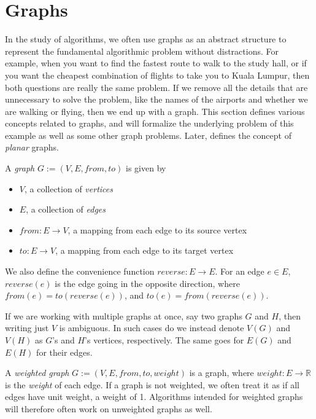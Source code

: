 \section{Graphs}
\label{section:graphs}
In the study of algorithms, we often use graphs as an abstract structure to represent the fundamental algorithmic problem without distractions. For example, when you want to find the fastest route to walk to the study hall, or if you want the cheapest combination of flights to take you to Kuala Lumpur, then both questions are really the same problem. If we remove all the details that are unnecessary to solve the problem, like the names of the airports and whether we are walking or flying, then we end up with a graph. This section defines various concepts related to graphs, and  will formalize the underlying problem of this example as well as some other graph problems. Later,  defines the concept of \emph{planar} graphs.

\begin{definition}[Graph]
    A \emph{graph} $G := (V, E, from, to)$ is given by
\begin{itemize}
    \item $V$, a collection of \emph{vertices}
    \item $E$, a collection of \emph{edges}
    \item $from : E \rightarrow V$, a mapping from each edge to its source vertex
    \item $to : E \rightarrow V$, a mapping from each edge to its target vertex 
\end{itemize}
\end{definition}

We also define the convenience function $reverse : E \rightarrow E$. For an edge $e \in E$, $reverse(e)$ is the edge going in the opposite direction, where $from(e) = to(reverse(e))$, and $to(e) = from(reverse(e))$.

If we are working with multiple graphs at once, say two graphs $G$ and $H$, then writing just $V$ is ambiguous. In such cases do we instead denote $V(G)$ and $V(H)$ as $G$'s and $H$'s vertices, respectively. The same goes for $E(G)$ and $E(H)$ for their edges.

\begin{definition}
    A \emph{weighted graph} $G := (V, E, from, to, weight)$ is a graph, where $weight : E \rightarrow \mathbb{R}$ is the \emph{weight} of each edge. If a graph is not weighted, we often treat it as if all edges have unit weight, a weight of 1. Algorithms intended for weighted graphs will therefore often work on unweighted graphs as well.
\end{definition}

